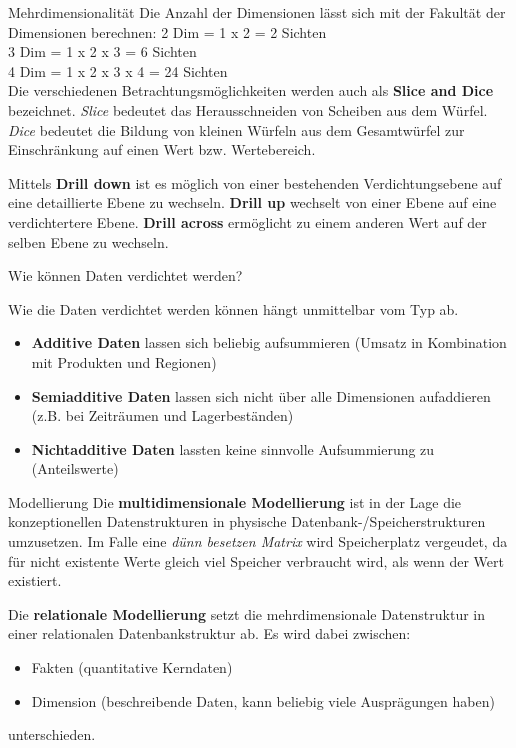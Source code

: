 \documentclass[a6paper,10pt,grid=front%
,toc
]{kartei}
\begin{document}
  \begin{karte}{Mehrdimensionalität}  
    Die Anzahl der Dimensionen lässt sich mit der Fakultät der Dimensionen berechnen:
    2 Dim = 1 x 2 = 2 Sichten\\
    3 Dim = 1 x 2 x 3 = 6 Sichten\\
    4 Dim = 1 x 2 x 3 x 4 = 24 Sichten\\

    Die verschiedenen Betrachtungsmöglichkeiten werden auch als \textbf{Slice and Dice} bezeichnet. \textit{Slice} bedeutet das Herausschneiden von Scheiben aus dem Würfel. \textit{Dice} bedeutet die Bildung von kleinen Würfeln aus dem Gesamtwürfel zur Einschränkung auf einen Wert bzw. Wertebereich.

    Mittels \textbf{Drill down} ist es möglich von einer bestehenden Verdichtungsebene auf eine detaillierte Ebene zu wechseln. \textbf{Drill up} wechselt von einer Ebene auf eine verdichtertere Ebene. \textbf{Drill across} ermöglicht zu einem anderen Wert auf der selben Ebene zu wechseln.
  \end{karte}

  \begin{karte}{Wie können Daten verdichtet werden?}  
    
    Wie die Daten verdichtet werden können hängt unmittelbar vom Typ ab.

    \begin{itemize}
      \item \textbf{Additive Daten} lassen sich beliebig aufsummieren (Umsatz in Kombination mit Produkten und Regionen)
      \item \textbf{Semiadditive Daten} lassen sich nicht über alle Dimensionen aufaddieren (z.B. bei Zeiträumen und Lagerbeständen)
      \item \textbf{Nichtadditive Daten} lassten keine sinnvolle Aufsummierung zu (Anteilswerte)
    \end{itemize}
  \end{karte}

  \begin{karte}{Modellierung}    
    Die \textbf{multidimensionale Modellierung} ist in der Lage die konzeptionellen Datenstrukturen in physische Datenbank-/Speicherstrukturen umzusetzen. Im Falle eine \textit{dünn besetzen Matrix} wird Speicherplatz vergeudet, da für nicht existente Werte gleich viel Speicher verbraucht wird, als wenn der Wert existiert.

    Die \textbf{relationale Modellierung} setzt die mehrdimensionale Datenstruktur in einer relationalen Datenbankstruktur ab. Es wird dabei zwischen:

    \begin{itemize}
      \item Fakten (quantitative Kerndaten)
      \item Dimension (beschreibende Daten, kann beliebig viele Ausprägungen haben)
    \end{itemize}

    unterschieden.
  \end{karte}
\end{document}
